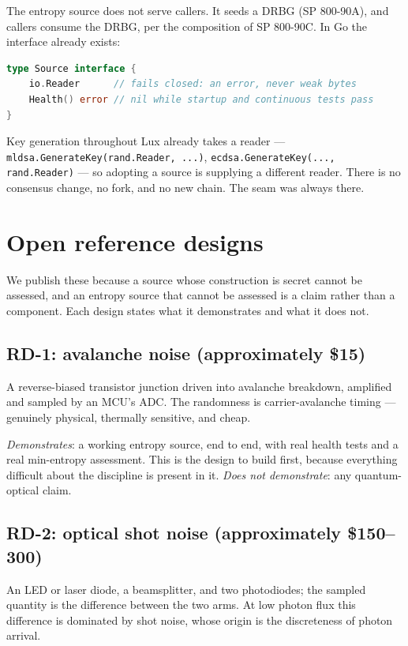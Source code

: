 \documentclass[11pt,a4paper]{article}
\begin{document}
The entropy source does not serve callers. It seeds a DRBG (SP 800-90A), and
callers consume the DRBG, per the composition of SP 800-90C. In Go the
interface already exists:

\begin{lstlisting}[language=Go]
type Source interface {
    io.Reader      // fails closed: an error, never weak bytes
    Health() error // nil while startup and continuous tests pass
}
\end{lstlisting}

Key generation throughout Lux already takes a reader ---
\lstinline{mldsa.GenerateKey(rand.Reader, ...)},
\lstinline{ecdsa.GenerateKey(..., rand.Reader)} --- so adopting a source is
supplying a different reader. There is no consensus change, no fork, and no new
chain. The seam was always there.

\section{Open reference designs}

We publish these because a source whose construction is secret cannot be
assessed, and an entropy source that cannot be assessed is a claim rather than
a component. Each design states what it demonstrates and what it does not.

\subsection{RD-1: avalanche noise (approximately \$15)}

A reverse-biased transistor junction driven into avalanche breakdown, amplified
and sampled by an MCU's ADC. The randomness is carrier-avalanche timing ---
genuinely physical, thermally sensitive, and cheap.

\emph{Demonstrates}: a working entropy source, end to end, with real health
tests and a real min-entropy assessment. This is the design to build first,
because everything difficult about the discipline is present in it.
\emph{Does not demonstrate}: any quantum-optical claim.

\subsection{RD-2: optical shot noise (approximately \$150--300)}

An LED or laser diode, a beamsplitter, and two photodiodes; the sampled
quantity is the difference between the two arms. At low photon flux this
difference is dominated by shot noise, whose origin is the discreteness of
photon arrival.
\end{document}
